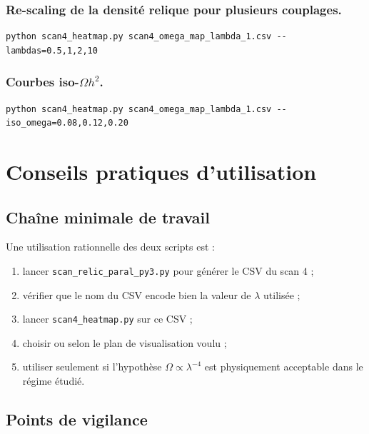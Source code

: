 \documentclass[11pt,a4paper]{article}
\newcommand{\script}[1]{\texttt{#1}}
\newcommand{\opt}[1]{\texttt{\detokenize{#1}}}
\begin{document}
\subsubsection*{Re-scaling de la densité relique pour plusieurs couplages.}
\begin{lstlisting}[style=bashstyle]
python scan4_heatmap.py scan4_omega_map_lambda_1.csv --lambdas=0.5,1,2,10
\end{lstlisting}

\subsubsection*{Courbes iso-$\Omega h^2$.}
\begin{lstlisting}[style=bashstyle]
python scan4_heatmap.py scan4_omega_map_lambda_1.csv --iso_omega=0.08,0.12,0.20
\end{lstlisting}

\section{Conseils pratiques d'utilisation}

\subsection{Chaîne minimale de travail}

Une utilisation rationnelle des deux scripts est :

\begin{enumerate}[leftmargin=1.4em]
\item lancer \script{scan\_relic\_paral\_py3.py} pour générer le CSV du scan 4 ;
\item vérifier que le nom du CSV encode bien la valeur de \(\lambda\) utilisée ;
\item lancer \script{scan4\_heatmap.py} sur ce CSV ;
\item choisir \opt{--all} ou \opt{--all2} selon le plan de visualisation voulu ;
\item utiliser \opt{--lambdas} seulement si l'hypothèse \(\Omega \propto \lambda^{-4}\) est physiquement acceptable dans le régime étudié.
\end{enumerate}

\subsection{Points de vigilance}
\end{document}
